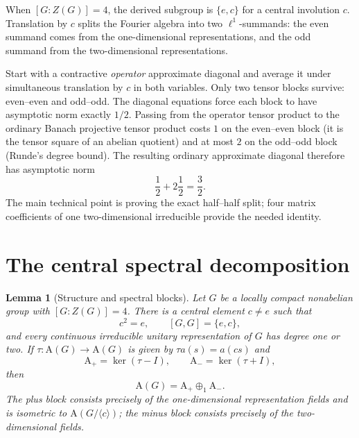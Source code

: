 \documentclass[11pt]{article}
\newtheorem{lemma}[theorem]{Lemma}
\newcommand{\A}{\mathrm A}
\begin{document}
When $[G:Z(G)]=4$, the derived subgroup is $\{e,c\}$ for a central involution
$c$.  Translation by $c$ splits the Fourier algebra into two $\ell^1$-summands:
the even summand comes from the one-dimensional representations, and the odd
summand from the two-dimensional representations.

Start with a contractive \emph{operator} approximate diagonal and average it
under simultaneous translation by $c$ in both variables.  Only two tensor
blocks survive: even--even and odd--odd.  The diagonal equations force each
block to have asymptotic norm exactly $1/2$.  Passing from the operator tensor
product to the ordinary Banach projective tensor product costs $1$ on the
even--even block (it is the tensor square of an abelian quotient) and at most
$2$ on the odd--odd block (Runde's degree bound).  The resulting ordinary
approximate diagonal therefore has asymptotic norm
\[
 \frac12+2\frac12=\frac32.
\]
The main technical point is proving the exact half--half split; four matrix
coefficients of one two-dimensional irreducible provide the needed identity.

\section{The central spectral decomposition}

\begin{lemma}[Structure and spectral blocks]\label{lem:blocks}
Let $G$ be a locally compact nonabelian group with $[G:Z(G)]=4$.  There is a
central element $c\ne e$ such that
\[
 c^2=e,\qquad [G,G]=\{e,c\},
\]
and every continuous irreducible unitary representation of $G$ has degree one
or two.  If $\tau:\A(G)\to\A(G)$ is given by
$\tau a(s)=a(cs)$ and
\[
 \A_+=\ker(\tau-I),\qquad \A_-=\ker(\tau+I),
\]
then
\[
 \A(G)=\A_+\oplus_1\A_-.
\]
The plus block consists precisely of the one-dimensional representation
fields and is isometric to $\A(G/\langle c\rangle)$; the minus block consists
precisely of the two-dimensional fields.
\end{lemma}
\end{document}

